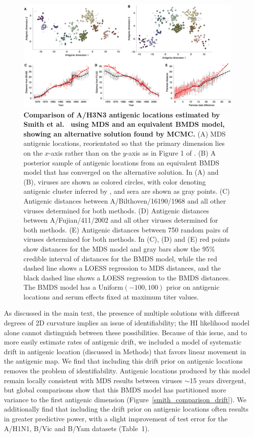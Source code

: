 \documentclass[11pt,oneside,letterpaper]{article}
\begin{document}
\begin{figure}[H]
	\centering		
	\includegraphics[width=1.0\textwidth]{figures/smith_comparison_rotation}
	\caption{\textbf{Comparison of A/H3N3 antigenic locations estimated by Smith et al.\ \cite{Smith04} using MDS and an equivalent BMDS model, showing an alternative solution found by MCMC.} 
	(A) MDS antigenic locations, reorientated so that the primary dimension lies on the $x$-axis rather than on the $y$-axis as in Figure 1 of \cite{Smith04}.
	(B) A posterior sample of antigenic locations from an equivalent BMDS model that has converged on the alternative solution.
	In (A) and (B), viruses are shown as colored circles, with color denoting antigenic cluster inferred by \cite{Smith04}, and sera are shown as gray points.
	(C) Antigenic distances between A/Bilthoven/16190/1968 and all other viruses determined for both methods.
	(D) Antigenic distances between A/Fujian/411/2002 and all other viruses determined for both methods.
	(E) Antigenic distances between 750 random pairs of viruses determined for both methods.	
	In (C), (D) and (E) red points show distances for the MDS model and gray bars show the 95\% credible interval of distances for the BMDS model, while the red dashed line shows a LOESS regression to MDS distances, and the black dashed line shows a LOESS regression to the BMDS distances.
	The BMDS model has a Uniform$(-100,100)$ prior on antigenic locations and serum effects fixed at maximum titer values. 	
	} 
	\label{smith_comparison_rotation} 
\end{figure}

As discussed in the main text, the presence of multiple solutions with different degrees of 2D curvature implies an issue of identifiability; the HI likelihood model alone cannot distinguish between these possibilities.
Because of this issue, and to more easily estimate rates of antigenic drift, we included a model of systematic drift in antigenic location (discussed in Methods) that favors linear movement in the antigenic map.
We find that including this drift prior on antigenic locations removes the problem of identifiability.
Antigenic locations produced by this model remain locally consistent with MDS results between viruses $\sim$15 years divergent, but global comparisons show that this BMDS model has partitioned more variance to the first antigenic dimension (Figure~\ref{smith_comparison_drift}).
We additionally find that including the drift prior on antigenic locations often results in greater predictive power, with a slight improvement of test error for the A/H1N1, B/Vic and B/Yam datasets (Table~1).
\end{document}
